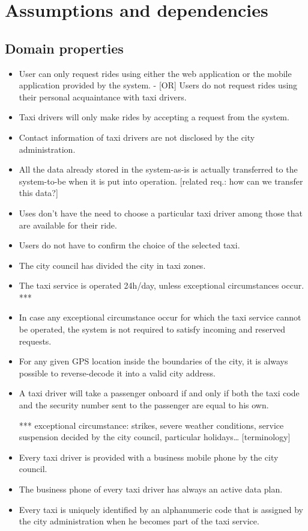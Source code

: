 \documentclass{book}
\begin{document}
\section{Assumptions and dependencies}
\subsection{Domain properties}
\begin{itemize}
\item User can only request rides using either the web application or the mobile application provided by the system.
- [OR] Users do not request rides using their personal acquaintance with taxi drivers.
\item Taxi drivers will only make rides by accepting a request from the system.
\item Contact information of taxi drivers are not disclosed by the city administration.
\item All the data already stored in the system-as-is is actually transferred to the system-to-be when it is put into operation. [related req.: how can we transfer this data?]
\item Uses don't have the need to choose a particular taxi driver among those that are available for their ride.
\item Users do not have to confirm the choice of the selected taxi.
\item The city council has divided the city in taxi zones.
\item The taxi service is operated 24h/day, unless exceptional circumstances occur. ***
\item In case any exceptional circumstance occur for which the taxi service cannot be operated, the system is not required to satisfy incoming and reserved requests. 
\item For any given GPS location inside the boundaries of the city, it is always possible to reverse-decode it into a valid city address. 
\item A taxi driver will take a passenger onboard if and only if both the taxi code and the security number sent to the passenger are equal to his own. 

*** exceptional circumstance: strikes, severe weather conditions, service suspension decided by the city council, particular holidays… [terminology]
\item Every taxi driver is provided with a business mobile phone by the city council.
\item The business phone of every taxi driver has always an active data plan.
\item Every taxi is uniquely identified by an alphanumeric code that is assigned by the city administration when he becomes part of the taxi service.
\end{itemize}
\end{document}
